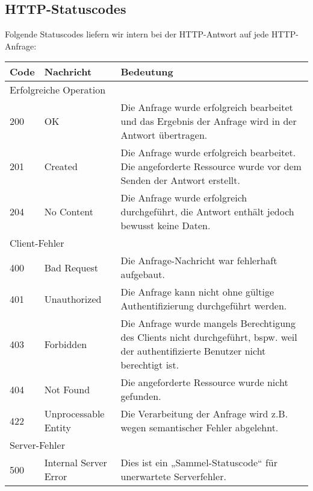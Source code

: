 	\subsection{HTTP-Statuscodes}
	Folgende Statuscodes liefern wir intern bei der HTTP-Antwort auf jede HTTP-Anfrage:
	\begin{flushleft}
		\begin{tabular}{|p{}|p{}|p{}|}
		\hline
		\textbf{Code} & \textbf{Nachricht} & \textbf{Bedeutung} \\
		\hline
		\multicolumn{3}{|l|}{Erfolgreiche Operation} \\
		\hline
		200 & OK & Die Anfrage wurde erfolgreich bearbeitet und das Ergebnis der Anfrage wird in der Antwort übertragen. \\
		201 & Created & Die Anfrage wurde erfolgreich bearbeitet. Die angeforderte Ressource wurde vor dem Senden der Antwort erstellt. \\
		204 & No Content & Die Anfrage wurde erfolgreich durchgeführt, die Antwort enthält jedoch bewusst keine Daten. \\
		\hline
		\multicolumn{3}{|l|}{Client-Fehler} \\
		\hline
		400 & Bad Request & Die Anfrage-Nachricht war fehlerhaft aufgebaut. \\
		401 & Unauthorized & Die Anfrage kann nicht ohne gültige Authentifizierung durchgeführt werden. \\
		403 & Forbidden & Die Anfrage wurde mangels Berechtigung des Clients nicht durchgeführt, bspw. weil der authentifizierte Benutzer nicht berechtigt ist. \\
		404 & Not Found & Die angeforderte Ressource wurde nicht gefunden. \\
		422 & Unprocessable Entity & Die Verarbeitung der Anfrage wird z.B. wegen semantischer Fehler abgelehnt. \\
		\hline
		\multicolumn{3}{|l|}{Server-Fehler} \\
		\hline
		500 & Internal Server Error & Dies ist ein „Sammel-Statuscode“ für unerwartete Serverfehler. \\
		\hline	
		\end{tabular}
	\end{flushleft}
%